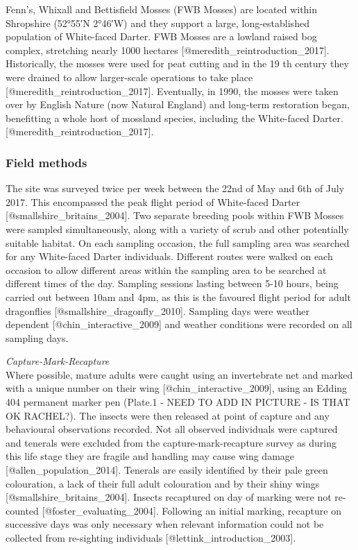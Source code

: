 \documentclass[]{article}
\begin{document}
Fenn's, Whixall and Bettisfield Mosses (FWB Mosses) are located within
Shropshire (52°55′N 2°46′W) and they support a large, long-established
population of White-faced Darter. FWB Mosses are a lowland raised bog
complex, stretching nearly 1000 hectares
{[}@meredith\_reintroduction\_2017{]}. Historically, the mosses were
used for peat cutting and in the 19 th century they were drained to
allow larger-scale operations to take place
{[}@meredith\_reintroduction\_2017{]}. Eventually, in 1990, the mosses
were taken over by English Nature (now Natural England) and long-term
restoration began, benefitting a whole host of mossland species,
including the White-faced Darter. {[}@meredith\_reintroduction\_2017{]}.

\subsubsection{Field methods}\label{field-methods}

The site was surveyed twice per week between the 22nd of May and 6th of
July 2017. This encompassed the peak flight period of White-faced Darter
{[}@smallshire\_britains\_2004{]}. Two separate breeding pools within
FWB Mosses were sampled simultaneously, along with a variety of scrub
and other potentially suitable habitat. On each sampling occasion, the
full sampling area was searched for any White-faced Darter individuals.
Different routes were walked on each occasion to allow different areas
within the sampling area to be searched at different times of the day.
Sampling sessions lasting between 5-10 hours, being carried out between
10am and 4pm, as this is the favoured flight period for adult
dragonflies {[}@smallshire\_dragonfly\_2010{]}. Sampling days were
weather dependent {[}@chin\_interactive\_2009{]} and weather conditions
were recorded on all sampling days.

\emph{Capture-Mark-Recapture}\\
Where possible, mature adults were caught using an invertebrate net and
marked with a unique number on their wing
{[}@chin\_interactive\_2009{]}, using an Edding 404 permanent marker pen
(Plate.1 - NEED TO ADD IN PICTURE - IS THAT OK RACHEL?). The insects
were then released at point of capture and any behavioural observations
recorded. Not all observed individuals were captured and tenerals were
excluded from the capture-mark-recapture survey as during this life
stage they are fragile and handling may cause wing damage
{[}@allen\_population\_2014{]}. Tenerals are easily identified by their
pale green colouration, a lack of their full adult colouration and by
their shiny wings {[}@smallshire\_britains\_2004{]}. Insects recaptured
on day of marking were not re-counted {[}@foster\_evaluating\_2004{]}.
Following an initial marking, recapture on successive days was only
necessary when relevant information could not be collected from
re-sighting individuals {[}@lettink\_introduction\_2003{]}.
\end{document}
